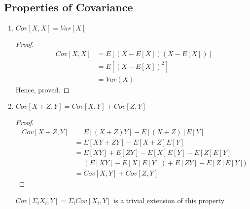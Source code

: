 \documentclass[12pt]{article}
\begin{document}
\subsection{Properties of Covariance}
\begin{enumerate}
    \item $Cov[X,X] = Var[X]$
    \vspace{-10pt}
    \begin{proof}
        \begin{align*}
            Cov[X,X] &=E[(X-E[X])(X-E[X])]\\
                     &=E[(X-E[X])^2]\\
                     &= Var(X)
        \end{align*}
    Hence, proved.
    \end{proof}
    \item $Cov[X+Z,Y] = Cov[X,Y]+Cov[Z,Y]$
    \vspace{-10pt}
    \begin{proof}
        \begin{align*}
            Cov[X+Z,Y] &= E[(X+Z)Y] -E[(X+Z)]E[Y]\\
                        &= E[XY+ZY] -E[X+Z]E[Y] \\
                        &= E[XY]+E[ZY]-E[X]E[Y]-E[Z]E[Y]\\
                        &= (E[XY]-E[X]E[Y])+E[ZY]-E[Z]E[Y])\\
                        &= Cov[X,Y] +Cov[Z,Y]
        \end{align*}
    \end{proof}
    $Cov[\Sigma_i X_i,Y] = \Sigma_i Cov[X_i, Y]$ is a trivial extension of this property
\end{enumerate}
\end{document}
